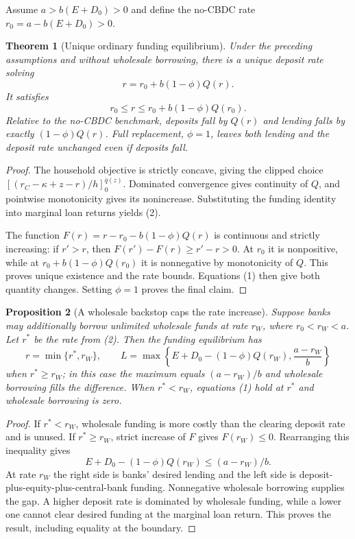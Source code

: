 \documentclass[11pt]{article}
\newtheorem{theorem}{Theorem}
\newtheorem{proposition}[theorem]{Proposition}
\theoremstyle{definition}
\begin{document}
Assume $a>b(E+D_0)>0$ and define the no-CBDC rate $r_0=a-b(E+D_0)>0$.

\begin{theorem}[Unique ordinary funding equilibrium]
Under the preceding assumptions and without wholesale borrowing, there is a unique deposit rate solving
\[
 r=r_0+b(1-\phi)Q(r).
 \tag{2}
\]
It satisfies
\[
 r_0\leq r\leq r_0+b(1-\phi)Q(r_0).
\]
Relative to the no-CBDC benchmark, deposits fall by $Q(r)$ and lending falls by exactly $(1-\phi)Q(r)$. Full replacement, $\phi=1$, leaves both lending and the deposit rate unchanged even if deposits fall.
\end{theorem}
\begin{proof}
The household objective is strictly concave, giving the clipped choice $[(r_C-\kappa+z-r)/h]_0^{\bar q(z)}$. Dominated convergence gives continuity of $Q$, and pointwise monotonicity gives its nonincrease. Substituting the funding identity into marginal loan returns yields (2).

The function $F(r)=r-r_0-b(1-\phi)Q(r)$ is continuous and strictly increasing: if $r'>r$, then $F(r')-F(r)\geq r'-r>0$. At $r_0$ it is nonpositive, while at $r_0+b(1-\phi)Q(r_0)$ it is nonnegative by monotonicity of $Q$. This proves unique existence and the rate bounds. Equations (1) then give both quantity changes. Setting $\phi=1$ proves the final claim.
\end{proof}

\begin{proposition}[A wholesale backstop caps the rate increase]
Suppose banks may additionally borrow unlimited wholesale funds at rate $r_W$, where $r_0<r_W<a$. Let $r^*$ be the rate from (2). Then the funding equilibrium has
\[
 r=\min\{r^*,r_W\},\qquad
 L=\max\left\{E+D_0-(1-\phi)Q(r_W),\frac{a-r_W}{b}\right\}
\]
when $r^*\geq r_W$; in this case the maximum equals $(a-r_W)/b$ and wholesale borrowing fills the difference. When $r^*<r_W$, equations (1) hold at $r^*$ and wholesale borrowing is zero.
\end{proposition}
\begin{proof}
If $r^*<r_W$, wholesale funding is more costly than the clearing deposit rate and is unused. If $r^*\geq r_W$, strict increase of $F$ gives $F(r_W)\leq0$. Rearranging this inequality gives
\[
 E+D_0-(1-\phi)Q(r_W)\leq(a-r_W)/b.
\]
At rate $r_W$ the right side is banks' desired lending and the left side is deposit-plus-equity-plus-central-bank funding. Nonnegative wholesale borrowing supplies the gap. A higher deposit rate is dominated by wholesale funding, while a lower one cannot clear desired funding at the marginal loan return. This proves the result, including equality at the boundary.
\end{proof}
\end{document}
